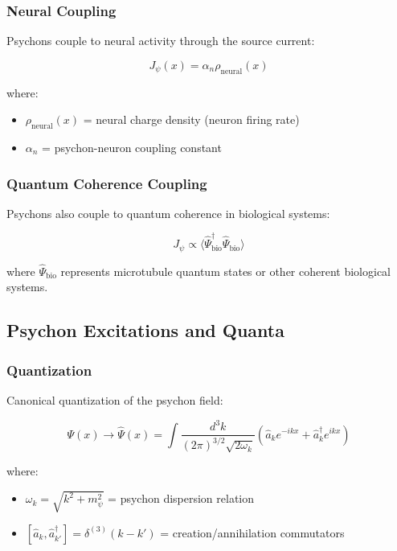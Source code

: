 \subsubsection{Neural Coupling}

Psychons couple to neural activity through the source current:

\begin{equation}
\label{eq:canonical:psychon_neural}
J_\psi(x) = \alpha_n \rho_{\text{neural}}(x)
\end{equation}

where:
\begin{itemize}
    \item $\rho_{\text{neural}}(x)$ = neural charge density (neuron firing rate)
    \item $\alpha_n$ = psychon-neuron coupling constant
\end{itemize}

\subsubsection{Quantum Coherence Coupling}

Psychons also couple to quantum coherence in biological systems:

\begin{equation}
J_\psi \propto \langle \hat{\Psi}_{\text{bio}}^\dagger \hat{\Psi}_{\text{bio}} \rangle
\end{equation}

where $\hat{\Psi}_{\text{bio}}$ represents microtubule quantum states or other coherent biological systems.

\subsection{Psychon Excitations and Quanta}

\subsubsection{Quantization}

Canonical quantization of the psychon field:

\begin{equation}
\Psi(x) \to \hat{\Psi}(x) = \int \frac{d^3k}{(2\pi)^{3/2}\sqrt{2\omega_k}} \left( \hat{a}_k e^{-ikx} + \hat{a}_k^\dagger e^{ikx} \right)
\end{equation}

where:
\begin{itemize}
    \item $\omega_k = \sqrt{k^2 + m_\psi^2}$ = psychon dispersion relation
    \item $[\hat{a}_k, \hat{a}_{k'}^\dagger] = \delta^{(3)}(k - k')$ = creation/annihilation commutators
\end{itemize}

